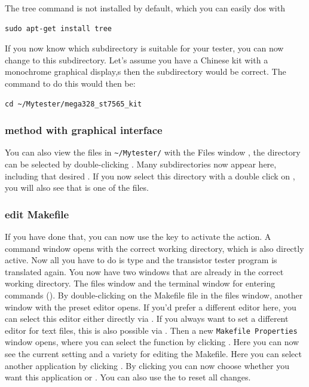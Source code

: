 The tree command is not installed by default, which you can easily dos with
\begin{large} \vspace{-0.4em} \begin{verbatim}
sudo apt-get install tree
\end{verbatim} \end{large}
If you now know which subdirectory is suitable for your tester,
you can now change to this subdirectory.
Let's assume you have a Chinese kit with a monochrome graphical display,s
then the subdirectory  would be correct.
The command to do this would then be:
\begin{large} \vspace{-0.4em} \begin{verbatim}
cd ~/Mytester/mega328_st7565_kit
\end{verbatim} \end{large}
 \subsubsection{method with graphical interface}
You can also view the files in \verb"~/Mytester/" with the Files window , the directory 
can be selected by double-clicking \LMB.
Many subdirectories now appear here, including that desired .
If you now select this directory with a double click on \LMB,
you will also see that  is one of the files.
\subsubsection{edit Makefile}
If you have done that, you can now use the \RMB key to activate the  action.
A command window opens with the correct working directory, which is also directly active.
Now all you have to do is type  and 
the transistor tester program is translated again.
You now have two windows that are already in the correct working directory.
The files window and the terminal window for entering commands ().
By double-clicking \LMB on the Makefile file in the files window,
another window with the preset editor opens.
If you'd prefer a different editor here, you can select this editor either
directly via \RMB {}.
If you always want to set a different editor for text files,
this is also possible via \RMB {}.
Then a new \verb"Makefile Properties" window opens, where you can select the
function  by clicking \RMB.
Here you can now see the current setting and a variety for editing the Makefile.
Here you can select another application by clicking \LMB.
By clicking \LMB you can now choose whether you want this
application  or .
You can also use the  to reset all changes. 

